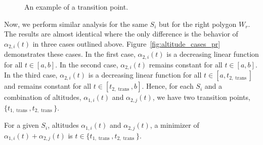 \documentclass[../main.tex]{subfiles}
\begin{document}

\begin{figure}
	\centering
	
	\caption{An example of a transition point.}
	\label{fig:transition_point}
\end{figure}

Now, we perform similar analysis for the same $S_i$ but for the right polygon $W_r$. The results are almost identical where the only difference is the behavior of $\alpha_{2,i}(t)$ in three cases outlined above. Figure~\ref{fig:altitude_cases_pr} demonstrates these cases. In the first case, $\alpha_{2,i}(t)$ is a decreasing linear function for all $t\in[a,b]$. In the second case, $\alpha_{2,i}(t)$ remains constant for all $t\in[a,b]$. In the third case, $\alpha_{2,i}(t)$ is a decreasing linear function for all $t\in[a,t_{2,\operatorname{trans}}]$ and remains constant for all $t\in[t_{2,\operatorname{trans}},b]$. Hence, for each $S_i$ and a combination of altitudes, $\alpha_{1,i}(t)$ and $\alpha_{2,j}(t)$, we have two transition points, $\{t_{1,\operatorname{trans}}, t_{2,\operatorname{trans}}\}$.
\begin{lemma}
\label{lemma:min_at_trans_pts}
For a given $S_i$, altitudes $\alpha_{1,i}(t)$ and $\alpha_{2,j}(t)$, a minimizer of $\alpha_{1,i}(t)+\alpha_{2,j}(t)$ is $t\in\{t_{1,\operatorname{trans}}, t_{2,\operatorname{trans}}\}$.
\end{lemma}
\end{document}
